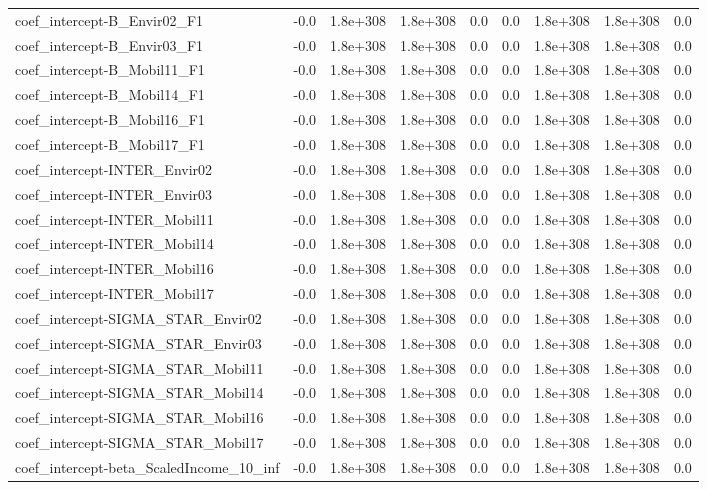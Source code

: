 \begin{tabular}{lrrrrrrrr}
coef_intercept-B_Envir02_F1 & -0.0 & 1.8e+308 & 1.8e+308 & 0.0 & 0.0 & 1.8e+308 & 1.8e+308 & 0.0 \\
coef_intercept-B_Envir03_F1 & -0.0 & 1.8e+308 & 1.8e+308 & 0.0 & 0.0 & 1.8e+308 & 1.8e+308 & 0.0 \\
coef_intercept-B_Mobil11_F1 & -0.0 & 1.8e+308 & 1.8e+308 & 0.0 & 0.0 & 1.8e+308 & 1.8e+308 & 0.0 \\
coef_intercept-B_Mobil14_F1 & -0.0 & 1.8e+308 & 1.8e+308 & 0.0 & 0.0 & 1.8e+308 & 1.8e+308 & 0.0 \\
coef_intercept-B_Mobil16_F1 & -0.0 & 1.8e+308 & 1.8e+308 & 0.0 & 0.0 & 1.8e+308 & 1.8e+308 & 0.0 \\
coef_intercept-B_Mobil17_F1 & -0.0 & 1.8e+308 & 1.8e+308 & 0.0 & 0.0 & 1.8e+308 & 1.8e+308 & 0.0 \\
coef_intercept-INTER_Envir02 & -0.0 & 1.8e+308 & 1.8e+308 & 0.0 & 0.0 & 1.8e+308 & 1.8e+308 & 0.0 \\
coef_intercept-INTER_Envir03 & -0.0 & 1.8e+308 & 1.8e+308 & 0.0 & 0.0 & 1.8e+308 & 1.8e+308 & 0.0 \\
coef_intercept-INTER_Mobil11 & -0.0 & 1.8e+308 & 1.8e+308 & 0.0 & 0.0 & 1.8e+308 & 1.8e+308 & 0.0 \\
coef_intercept-INTER_Mobil14 & -0.0 & 1.8e+308 & 1.8e+308 & 0.0 & 0.0 & 1.8e+308 & 1.8e+308 & 0.0 \\
coef_intercept-INTER_Mobil16 & -0.0 & 1.8e+308 & 1.8e+308 & 0.0 & 0.0 & 1.8e+308 & 1.8e+308 & 0.0 \\
coef_intercept-INTER_Mobil17 & -0.0 & 1.8e+308 & 1.8e+308 & 0.0 & 0.0 & 1.8e+308 & 1.8e+308 & 0.0 \\
coef_intercept-SIGMA_STAR_Envir02 & -0.0 & 1.8e+308 & 1.8e+308 & 0.0 & 0.0 & 1.8e+308 & 1.8e+308 & 0.0 \\
coef_intercept-SIGMA_STAR_Envir03 & -0.0 & 1.8e+308 & 1.8e+308 & 0.0 & 0.0 & 1.8e+308 & 1.8e+308 & 0.0 \\
coef_intercept-SIGMA_STAR_Mobil11 & -0.0 & 1.8e+308 & 1.8e+308 & 0.0 & 0.0 & 1.8e+308 & 1.8e+308 & 0.0 \\
coef_intercept-SIGMA_STAR_Mobil14 & -0.0 & 1.8e+308 & 1.8e+308 & 0.0 & 0.0 & 1.8e+308 & 1.8e+308 & 0.0 \\
coef_intercept-SIGMA_STAR_Mobil16 & -0.0 & 1.8e+308 & 1.8e+308 & 0.0 & 0.0 & 1.8e+308 & 1.8e+308 & 0.0 \\
coef_intercept-SIGMA_STAR_Mobil17 & -0.0 & 1.8e+308 & 1.8e+308 & 0.0 & 0.0 & 1.8e+308 & 1.8e+308 & 0.0 \\
coef_intercept-beta_ScaledIncome_10_inf & -0.0 & 1.8e+308 & 1.8e+308 & 0.0 & 0.0 & 1.8e+308 & 1.8e+308 & 0.0 \\

\end{tabular}
